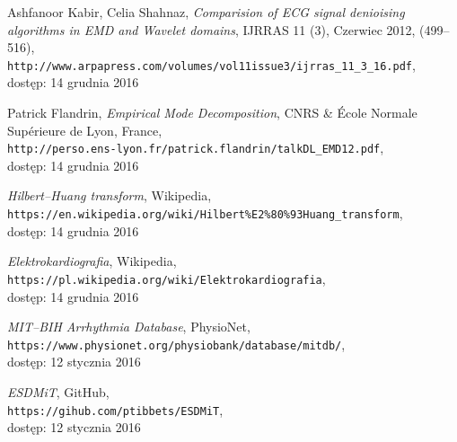 \begin{thebibliography}{9}
        Ashfanoor Kabir, Celia Shahnaz, 
        \textit{Comparision of ECG signal denioising algorithms in EMD and
        Wavelet domains}, IJRRAS 11 (3), Czerwiec 2012, (499--516),\\
        \verb+http://www.arpapress.com/volumes/vol11issue3/ijrras_11_3_16.pdf+,\\
        dostęp: 14 grudnia 2016
        
        Patrick Flandrin,
        \textit{Empirical Mode Decomposition}, CNRS \& École Normale Supérieure
        de Lyon, France,\\
        \verb+http://perso.ens-lyon.fr/patrick.flandrin/talkDL_EMD12.pdf+,\\
        dostęp: 14 grudnia 2016
        
        \textit{Hilbert--Huang transform}, Wikipedia,\\
        \verb+https://en.wikipedia.org/wiki/Hilbert%E2%80%93Huang_transform+,\\
        dostęp: 14 grudnia 2016
        
        \textit{Elektrokardiografia}, Wikipedia,\\
        \verb+https://pl.wikipedia.org/wiki/Elektrokardiografia+,\\
        dostęp: 14 grudnia 2016
        
        \textit{MIT--BIH Arrhythmia Database}, PhysioNet,\\
        \verb+https://www.physionet.org/physiobank/database/mitdb/+,\\
        dostęp: 12 stycznia 2016
        
        \textit{ESDMiT}, GitHub,\\
        \verb+https://gihub.com/ptibbets/ESDMiT+,\\
        dostęp: 12 stycznia 2016

\end{thebibliography}